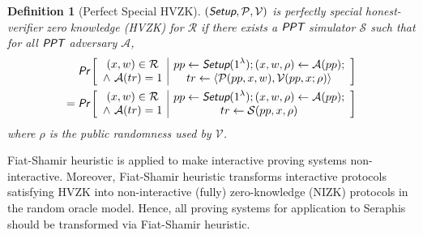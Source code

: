 \documentclass{article}
\newtheorem{definition}{Definition}[section]
\begin{document}
\begin{definition}[Perfect Special HVZK]
$(\emph{\textsf{Setup}}, \mathcal{P}, \mathcal{V})$ is perfectly special honest-verifier zero knowledge (HVZK) for $\mathcal{R}$ if there exists a $\emph{\textsf{PPT}}$ simulator $\mathcal{S}$ such that for all $\emph{\textsf{PPT}}$ adversary $\mathcal{A}$,
\begin{align*}
\emph{\textsf{Pr}}\left[
\begin{array}{c|c}
    \begin{gathered}
        (x,w)\in\mathcal{R}\\
        \wedge\ \mathcal{A}(tr) = 1
    \end{gathered}
    &
    \begin{gathered}
        pp\leftarrow\emph{\textsf{Setup}}(1^{\lambda}); (x, w, \rho)\leftarrow\mathcal{A}(pp); \\
        tr\leftarrow\langle\mathcal{P}(pp,x,w), \mathcal{V}(pp,x; \rho)\rangle
    \end{gathered}
\end{array}
\right] \\
=\emph{\textsf{Pr}}\left[
\begin{array}{c|c}
    \begin{gathered}
        (x,w)\in\mathcal{R}\\
        \wedge\ \mathcal{A}(tr) = 1
    \end{gathered}
    &
    \begin{gathered}
        pp\leftarrow\emph{\textsf{Setup}}(1^{\lambda}); (x, w, \rho)\leftarrow\mathcal{A}(pp); \\
        tr\leftarrow\mathcal{S}(pp, x, \rho)
    \end{gathered}
\end{array}
\right]
\end{align*}
where $\rho$ is the public randomness used by $\mathcal{V}$.
\end{definition}

Fiat-Shamir heuristic \cite{fiat-shamir} is applied to make interactive proving systems non-interactive. Moreover, Fiat-Shamir heuristic transforms interactive protocols satisfying HVZK into non-interactive (fully) zero-knowledge (NIZK) protocols in the random oracle model. Hence, all proving systems for application to Seraphis should be transformed via Fiat-Shamir heuristic.
\end{document}
